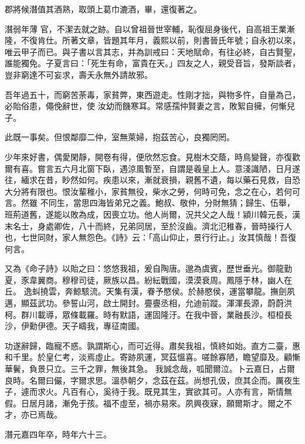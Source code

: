 \begin{pinyinscope}
 郡將候潛值其酒熟，取頭上葛巾漉酒，畢，還復著之。



 潛弱年薄
 官，不潔去就之跡。自以曾祖晉世宰輔，恥復屈身後代，自高祖王業漸隆，不復肯仕。所著文章，皆題其年月，義熙以前，則書晉氏年號；自永初以來，唯云甲子而已。與子書以言其志，并為訓戒曰：天地賦命，有往必終，自古賢聖，誰能獨免。子夏言曰：「死生有命，富貴在天。」四友之人，親受音旨，發斯談者，豈非窮達不可妄求，壽夭永無外請故邪。



 吾年過五十，而窮苦荼毒，家貧弊，東西遊走。性剛才拙，與物多忤，自量為己，必貽俗患，僶俛辭世，使
 汝幼而饑寒耳。常感孺仲賢妻之言，敗絮自擁，何慚兒子。



 此既一事矣。但恨鄰靡二仲，室無萊婦，抱茲苦心，良獨罔罔。



 少年來好書，偶愛閑靜，開卷有得，便欣然忘食。見樹木交蔭，時鳥變聲，亦復歡爾有喜。嘗言五六月北窗下臥，遇涼風暫至，自謂是羲皇上人。意淺識陋，日月遂往，緬求在昔，眇然如何。疾患以來，漸就衰損，親舊不遺，每以藥石見救，自恐大分將有限也。恨汝輩稚小，家貧無役，柴水之勞，何時可免，念之在心，若何可言。然雖
 不同生，當思四海皆弟兄之義。鮑叔、敬仲，分財無猜；歸生、伍舉，班荊道舊，遂能以敗為成，因喪立功。他人尚爾，況共父之人哉！潁川韓元長，漢末名士，身處卿佐，八十而終，兄弟同居，至於沒齒。濟北氾稚春，晉時操行人也，七世同財，家人無怨色。《詩》云：「高山仰止，景行行止。」汝其慎哉！吾復何言。



 又為《命子詩》以貽之曰：悠悠我祖，爰自陶唐。邈為虞賓，歷世垂光。御龍勤夏，豕韋翼商。穆穆司徒，厥族以昌。紛紜戰國，漠漠衰周。鳳隱于林，幽人在丘。
 逸虯撓雲，奔鯨駭流。天集有漢，眷予愍侯。於赫愍侯，運當攀龍。撫劍夙邁，顯茲武功。參誓山河，啟土開封。亹亹丞相，允迪前蹤。渾渾長源，蔚蔚洪柯。群川載導，眾條載羅。時有默語，運固隆汙。在我中晉，業融長沙。桓桓長沙，伊勳伊德。天子疇我，專征南國。



 功遂辭歸，臨寵不惑。孰謂斯心，而可近得。肅矣我祖，慎終如始。直方二臺，惠和千里。於皇仁考，淡焉虛止。寄跡夙運，冥茲慍喜。嗟餘寡陋，瞻望靡及。顧慚華鬢，負景只立。三千之罪，無後其急。
 我誠念哉，呱聞爾泣。卜云嘉日，占爾良時。名爾曰儼，字爾求思。溫恭朝夕，念茲在茲。尚想孔伋，庶其企而。厲夜生子，遽而求火。凡百有心，奚待于我。既見其生，實欲其可。人亦有言，斯情無假。日居月諸，漸免于孩。福不虛至，禍亦易來。夙興夜寐，願爾斯才。爾之不才，亦已焉哉。



 潛元嘉四年卒，時年六十三。




\end{pinyinscope}
